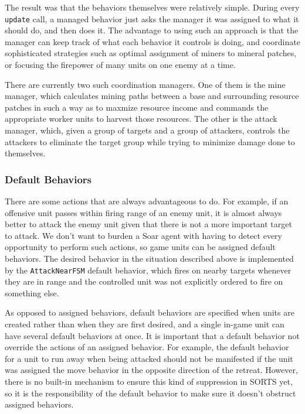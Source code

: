 The result was that the behaviors themselves were relatively simple.
During every {\tt update} call, a managed behavior just asks the manager
it was assigned to what it should do, and then does it. The advantage to
using such an approach is that the manager can keep track of what each
behavior it controls is doing, and coordinate sophisticated strategies
such as optimal assignment of miners to mineral patches, or focusing the
firepower of many units on one enemy at a time.

There are currently two such coordination managers. One of them is
the mine manager, which calculates mining paths between a base and
surrounding resource patches in such a way as to maxmize resource income
and commands the appropriate worker units to harvest those resources.
The other is the attack manager, which, given a group of targets and a
group of attackers, controls the attackers to eliminate the target group
while trying to minimize damage done to themselves. 

\subsubsection{Default Behaviors}

There are some actions that are always advantageous to do. For example,
if an offensive unit passes within firing range of an enemy unit, it is
almost always better to attack the enemy unit given that there is not a
more important target to attack. We don't want to burden a Soar agent
with having to detect every opportunity to perform such actions, so
game units can be assigned default behaviors. The desired behavior in
the situation described above is implemented by the {\tt AttackNearFSM}
default behavior, which fires on nearby targets whenever they are in
range and the controlled unit was not explicitly ordered to fire on
something else.

As opposed to assigned behaviors, default behaviors are specified
when units are created rather than when they are first desired, and
a single in-game unit can have several default behaviors at once.
It is important that a default behavior not override the actions
of an assigned behavior. For example, the default behavior for a
unit to run away when being attacked should not be manifested if the
unit was assigned the move behavior in the opposite direction of the
retreat. However, there is no built-in mechanism to ensure this kind of
suppression in SORTS yet, so it is the responsibility of the default
behavior to make sure it doesn't obstruct assigned behaviors.

